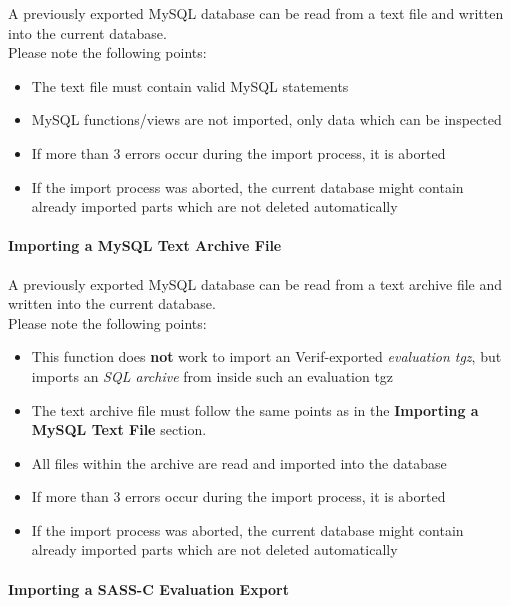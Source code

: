 A previously exported MySQL database can be read from a text file and written into the current database. \\

Please note the following points:

\begin{itemize}  
\item The text file must contain valid MySQL statements
\item MySQL functions/views are not imported, only data which can be inspected
\item If more than 3 errors occur during the import process, it is aborted
\item If the import process was aborted, the current database might contain already imported parts which are not deleted automatically
\end{itemize}

\paragraph{Importing a MySQL Text Archive File}

A previously exported MySQL database can be read from a text archive file and written into the current database. \\

Please note the following points:

\begin{itemize}  
\item This function does \textbf{not} work to import an Verif-exported \textit{evaluation tgz}, but imports an \textit{SQL archive} from inside such an evaluation tgz
\item The text archive file must follow the same points as in the \textbf{Importing a MySQL Text File} section.
\item All files within the archive are read and imported into the database
\item If more than 3 errors occur during the import process, it is aborted
\item If the import process was aborted, the current database might contain already imported parts which are not deleted automatically
\end{itemize}

\paragraph{Importing a SASS-C Evaluation Export}


